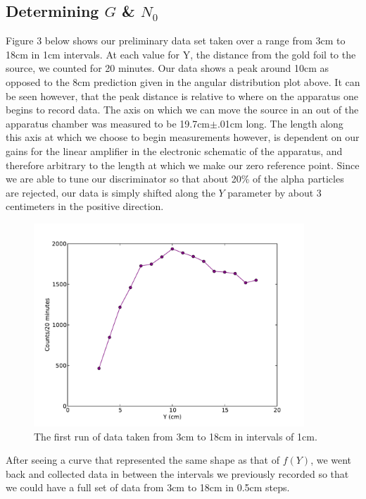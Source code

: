 \subsection{Determining $G$ \& $N_0$}
Figure 3 below shows our preliminary data set taken over a range from 3cm to 18cm in 1cm intervals. At each value for Y, the distance from the gold foil to the source, we counted for 20 minutes. Our data shows a peak around 10cm as opposed to the 8cm prediction given in the angular distribution plot above. It can be seen however, that the peak distance is relative to where on the apparatus one begins to record data. The axis on which we can move the source in an out of the apparatus chamber was measured to be 19.7cm$\pm$.01cm long. The length along this axis at which we choose to begin measurements however, is dependent on our gains for the linear amplifier in the electronic schematic of the apparatus, and therefore arbitrary to the length at which we make our zero reference point. Since we are able to tune our discriminator so that about 20\% of the alpha particles are rejected, our data is simply shifted along the $Y$ parameter by about 3 centimeters in the positive direction. 
\begin{figure}[H]
\begin{center}
\includegraphics[width=4in]{firstrun.pdf}
\caption{The first run of data taken from 3cm to 18cm in intervals of 1cm.}
\end{center}
\end{figure}
After seeing a curve that represented the same shape as that of $f(Y)$, we went back and collected data in between the intervals we previously recorded so that we could have a full set of data from 3cm to 18cm in 0.5cm steps. 
